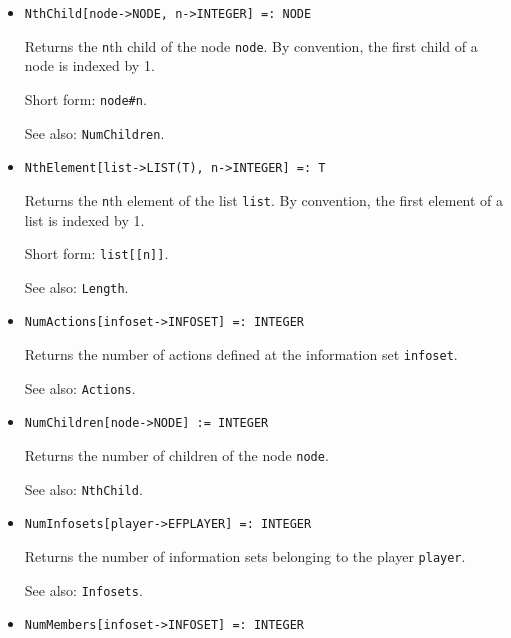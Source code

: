 \begin{itemize}
\item
\protect \large \begin{verbatim} 
NthChild[node->NODE, n->INTEGER] =: NODE
\end{verbatim}\normalsize

\bd
Returns the \verb+n+th child of the node \verb+node+.
By convention, the first child of a node is indexed by 1.
\item
[Short form:] \verb+node#n+.
\item
[See also:] {\tt NumChildren}.
\ed

\item
\protect \large \begin{verbatim}
NthElement[list->LIST(T), n->INTEGER] =: T 
\end{verbatim}\normalsize

\bd
Returns the \verb+n+th element of the list \verb+list+.
By convention, the first element of a list is indexed by 1.
\item
[Short form:] \verb+list[[n]]+.
\item
[See also:] {\tt Length}.
\ed

\item
\protect \large \begin{verbatim}
NumActions[infoset->INFOSET] =: INTEGER
\end{verbatim}\normalsize

\bd
Returns the number of actions defined at the information
set \verb+infoset+.
\item
[See also:] {\tt Actions}.
\ed

\item
\protect \large \begin{verbatim}
NumChildren[node->NODE] := INTEGER
\end{verbatim}\normalsize

\bd
Returns the number of children of the node \verb+node+.
\item
[See also:] {\tt NthChild}.
\ed

\item
\protect \large \begin{verbatim}
NumInfosets[player->EFPLAYER] =: INTEGER
\end{verbatim}\normalsize

\bd
Returns the number of information sets belonging to the
player \verb+player+.
\item
[See also:] {\tt Infosets}.
\ed

\item
\protect \large \begin{verbatim}
NumMembers[infoset->INFOSET] =: INTEGER
\end{verbatim}\normalsize


\end{itemize}
